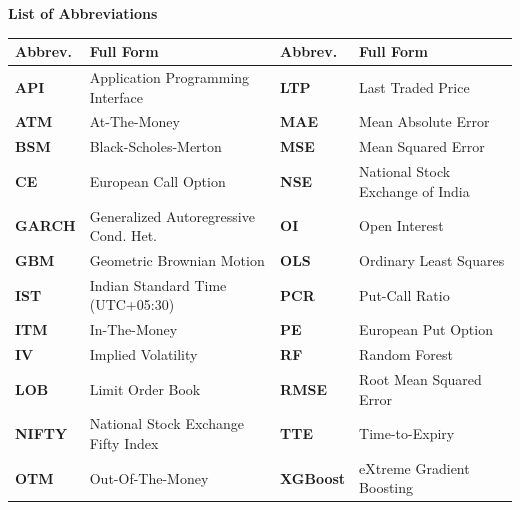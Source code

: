 \documentclass[11pt,oneside]{report}
\begin{document}
\newpage
{}
{}
\begin{center}
    \textbf{\Large List of Abbreviations} \\[0.3cm]
    \small
    \renewcommand{\arraystretch}{0.95}
    \begin{tabular}{ll@{\qquad}ll}
        \toprule
        \textbf{Abbrev.} & \textbf{Full Form} & \textbf{Abbrev.} & \textbf{Full Form} \\
        \midrule
        \textbf{API} & Application Programming Interface & \textbf{LTP} & Last Traded Price \\
        \textbf{ATM} & At-The-Money & \textbf{MAE} & Mean Absolute Error \\
        \textbf{BSM} & Black-Scholes-Merton & \textbf{MSE} & Mean Squared Error \\
        \textbf{CE} & European Call Option & \textbf{NSE} & National Stock Exchange of India \\
        \textbf{GARCH} & Generalized Autoregressive Cond. Het. & \textbf{OI} & Open Interest \\
        \textbf{GBM} & Geometric Brownian Motion & \textbf{OLS} & Ordinary Least Squares \\
        \textbf{IST} & Indian Standard Time (UTC+05:30) & \textbf{PCR} & Put-Call Ratio \\
        \textbf{ITM} & In-The-Money & \textbf{PE} & European Put Option \\
        \textbf{IV} & Implied Volatility & \textbf{RF} & Random Forest \\
        \textbf{LOB} & Limit Order Book & \textbf{RMSE} & Root Mean Squared Error \\
        \textbf{NIFTY} & National Stock Exchange Fifty Index & \textbf{TTE} & Time-to-Expiry \\
        \textbf{OTM} & Out-Of-The-Money & \textbf{XGBoost} & eXtreme Gradient Boosting \\
        \bottomrule
    \end{tabular}
\end{center}

\newpage
{}
\pagestyle{fancy}









\end{document}
